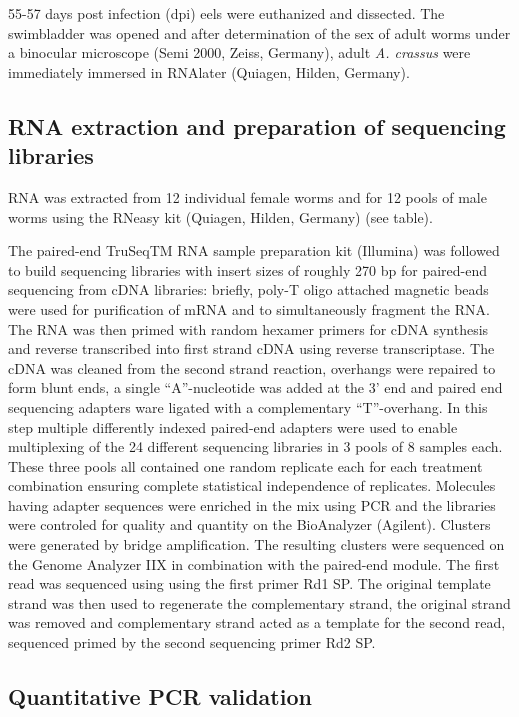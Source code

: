 55-57 days post infection (dpi) eels were euthanized and dissected.
The swimbladder was opened and after determination of the sex of adult
worms under a binocular microscope (Semi 2000, Zeiss, Germany), adult
\textit{A. crassus} were immediately immersed in RNAlater (Quiagen,
Hilden, Germany).

\subsection{RNA extraction and preparation of sequencing libraries}

RNA was extracted from 12 individual female worms and for 12 pools of
male worms using the RNeasy kit (Quiagen, Hilden, Germany) (see
table).

The paired-end TruSeqTM RNA sample preparation kit (Illumina) was
followed to build sequencing libraries with insert sizes of roughly
270 bp for paired-end sequencing from cDNA libraries: briefly, poly-T
oligo attached magnetic beads were used for purification of mRNA and
to simultaneously fragment the RNA. The RNA was then primed with
random hexamer primers for cDNA synthesis and reverse transcribed into
first strand cDNA using reverse transcriptase. The cDNA was cleaned
from the second strand reaction, overhangs were repaired to form blunt
ends, a single ``A''-nucleotide was added at the 3' end and paired end
sequencing adapters ware ligated with a complementary
``T''-overhang. In this step multiple differently indexed paired-end
adapters were used to enable multiplexing of the 24 different
sequencing libraries in 3 pools of 8 samples each. These three pools
all contained one random replicate each for each treatment combination
ensuring complete statistical independence of replicates. Molecules
having adapter sequences were enriched in the mix using PCR and the
libraries were controled for quality and quantity on the BioAnalyzer
(Agilent). Clusters were generated by bridge amplification. The
resulting clusters were sequenced on the Genome Analyzer IIX in
combination with the paired-end module. The first read was sequenced
using using the first primer Rd1 SP. The original template strand was
then used to regenerate the complementary strand, the original strand
was removed and complementary strand acted as a template for the
second read, sequenced primed by the second sequencing primer Rd2 SP.

\subsection{Quantitative PCR validation}

